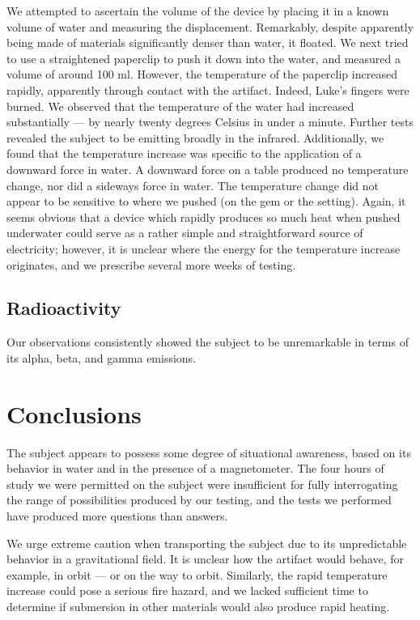 \documentclass[10pt]{article}
\begin{document}
We attempted to ascertain the volume of the device by placing it in a known volume of water and measuring the displacement.
Remarkably, despite apparently being made of materials significantly denser than water, it floated.
We next tried to use a straightened paperclip to push it down into the water, and measured a volume of around 100 ml.
However, the temperature of the paperclip increased rapidly, apparently through contact with the artifact. 
Indeed, Luke's fingers were burned.
We observed that the temperature of the water had increased substantially --- by nearly twenty degrees Celsius in under a minute.
Further tests revealed the subject to be emitting broadly in the infrared.
Additionally, we found that the temperature increase was specific to the application of a downward force in water.
A downward force on a table produced no temperature change, nor did a sideways force in water.
The temperature change did not appear to be sensitive to where we pushed (on the gem or the setting).
Again, it seems obvious that a device which rapidly produces so much heat when pushed underwater could serve as a rather simple and straightforward source of electricity; however, it is unclear where the energy for the temperature increase originates, and we prescribe several more weeks of testing.

\subsection{Radioactivity}
Our observations consistently showed the subject to be unremarkable in terms of its alpha, beta, and gamma emissions.

\section{Conclusions}\label{conclusions}
The subject appears to possess some degree of situational awareness, based on its behavior in water and in the presence of a magnetometer.
The four hours of study we were permitted on the subject were insufficient for fully interrogating the range of possibilities produced by our testing, and the tests we performed have produced more questions than answers.

We urge extreme caution when transporting the subject due to its unpredictable behavior in a gravitational field.
It is unclear how the artifact would behave, for example, in orbit --- or on the way to orbit.
Similarly, the rapid temperature increase could pose a serious fire hazard, and we lacked sufficient time to determine if submersion in other materials would also produce rapid heating.

%
%
\end{document}
